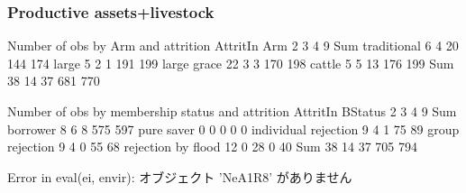 \subsubsection{Productive assets+livestock}


\begin{Schunk}
\begin{Soutput}


Number of obs by Arm and attrition
             AttritIn
Arm             2   3   4   9 Sum
  traditional   6   4  20 144 174
  large         5   2   1 191 199
  large grace  22   3   3 170 198
  cattle        5   5  13 176 199
  Sum          38  14  37 681 770


Number of obs by membership status and attrition
                      AttritIn
BStatus                  2   3   4   9 Sum
  borrower               8   6   8 575 597
  pure saver             0   0   0   0   0
  individual rejection   9   4   1  75  89
  group rejection        9   4   0  55  68
  rejection by flood    12   0  28   0  40
  Sum                   38  14  37 705 794
\end{Soutput}
\begin{Soutput}
Error in eval(ei, envir):  オブジェクト 'NeA1R8' がありません 
\end{Soutput}
\end{Schunk}




